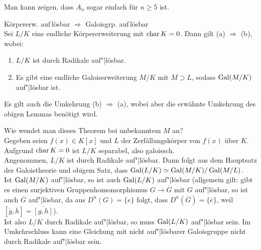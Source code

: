 \begin{Bem}
    Man kann zeigen, dass $A_n$ sogar einfach für $n \ge 5$ ist.
\end{Bem}

\linie
\pagebreak

\begin{Theorem}{Körpererw. auf\,\!lösbar $\Rightarrow$
                Galoisgrp. auf\,\!lösbar}\\
    Sei $L/K$ eine endliche Körpererweiterung mit $\operatorname{char} K = 0$.
    Dann gilt (a) $\Rightarrow$ (b), wobei:
    \begin{enumerate}[label=(\alph*)]
        \item
        $L/K$ ist durch Radikale auf"|lösbar.

        \item
        Es gibt eine endliche Galoiserweiterung $M/K$ mit $M \supset L$,
        sodass $\operatorname{Gal}(M/K)$ auf"|lösbar ist.
    \end{enumerate}
\end{Theorem}

\begin{Bem}
    Es gilt auch die Umkehrung (b) $\Rightarrow$ (a), wobei aber die
    erwähnte Umkehrung des obigen Lemmas benötigt wird.
\end{Bem}

\begin{Bem}
    Wie wendet man dieses Theorem bei unbekanntem $M$ an?\\
    Gegeben seien $f(x) \in K[x]$ und
    $L$ der Zerfällungskörper von $f(x)$ über $K$.
    Aufgrund $\operatorname{char} K = 0$ ist $L/K$ separabel, also galoissch.\\
    Angenommen, $L/K$ ist durch Radikale auf"|lösbar.
    Dann folgt aus dem Hauptsatz der Galoistheorie und obigem Satz, dass
    $\operatorname{Gal}(L/K) \simeq \operatorname{Gal}(M/K)/\operatorname{Gal}(M/L)$.\\
    Ist $\operatorname{Gal}(M/K)$ auf"|lösbar, so ist auch $\operatorname{Gal}(L/K)$ auf"|lösbar
    (allgemein gilt:
    gibt es einen surjektiven Gruppenhomomorphismus
    $G \rightarrow \overline{G}$ mit $G$ auf"|lösbar, so ist auch
    $\overline{G}$ auf"|lösbar,
    da aus $D^n(G) = \{e\}$ folgt, dass
    $D^n(\overline{G}) = \{\overline{e}\}$, weil
    $[\overline{g}, \overline{h}] = \overline{[g, h]}$).\\
    Ist also $L/K$ durch Radikale auf"|lösbar, so muss
    $\operatorname{Gal}(L/K)$ auf"|lösbar sein.
    Im Umkehrschluss kann eine Gleichung mit nicht auf"|lösbarer Galoisgruppe
    nicht durch Radikale auf"|lösbar sein.
\end{Bem}

